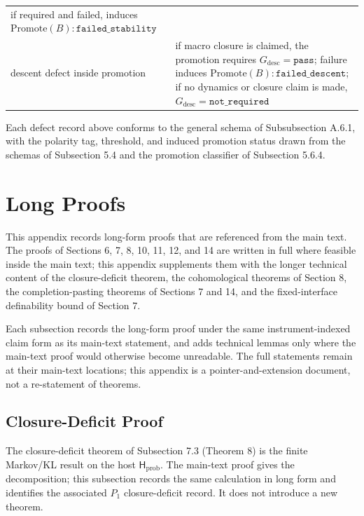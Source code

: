 \documentclass[11pt]{article}
\theoremstyle{definition}
\begin{document}
\begin{longtable}[]{@{}ll@{}}
\begin{minipage}[t]{0.47\columnwidth}
if required and failed, induces \(\mathrm{Promote}(B):\texttt{failed\_stability}\)\strut
\end{minipage}\tabularnewline
\begin{minipage}[t]{0.47\columnwidth}\raggedright
descent defect inside promotion\strut
\end{minipage} & \begin{minipage}[t]{0.47\columnwidth}\raggedright
if macro closure is claimed, the promotion requires \(G_{\mathrm{desc}}=\texttt{pass}\); failure induces \(\mathrm{Promote}(B):\texttt{failed\_descent}\); if no dynamics or closure claim is made, \(G_{\mathrm{desc}}=\texttt{not\_required}\)\strut
\end{minipage}\tabularnewline
\bottomrule
\end{longtable}

Each defect record above conforms to the general schema of Subsubsection A.6.1, with the polarity tag, threshold, and induced promotion status drawn from the schemas of Subsection 5.4 and the promotion classifier of Subsection 5.6.4.
 \section{Long Proofs}

This appendix records long-form proofs that are referenced from the main text. The proofs of Sections 6, 7, 8, 10, 11, 12, and 14 are written in full where feasible inside the main text; this appendix supplements them with the longer technical content of the closure-deficit theorem, the cohomological theorems of Section 8, the completion-pasting theorems of Sections 7 and 14, and the fixed-interface definability bound of Section 7.

Each subsection records the long-form proof under the same instrument-indexed claim form as its main-text statement, and adds technical lemmas only where the main-text proof would otherwise become unreadable. The full statements remain at their main-text locations; this appendix is a pointer-and-extension document, not a re-statement of theorems.

\subsection{Closure-Deficit Proof}

The closure-deficit theorem of Subsection 7.3 (Theorem 8) is the finite Markov/KL result on the host \(\mathsf H_{\mathrm{prob}}\). The main-text proof gives the decomposition; this subsection records the same calculation in long form and identifies the associated \(P_1\) closure-deficit record. It does not introduce a new theorem.
\end{document}
